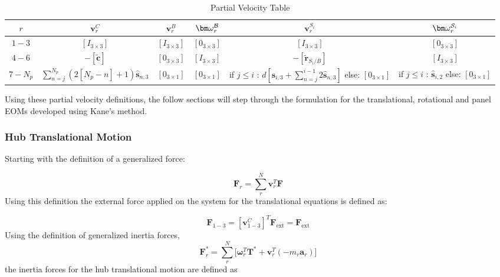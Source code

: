 \begin{table}[H]
	\caption{Partial Velocity Table}
	\label{tab:hub}
	\centering \fontsize{10}{10}\selectfont
	\begin{tabular}{ |c | c | c | c | c | c |} %
		\hline
		$r$ & $\bm v^{C}_{r}$ & $\bm v^{B}_{r}$  & $\bm \omega_{\textit{r}}^{\cal{B}}$ & $\bm v^{S_i}_{r}$ & $\bm \omega_{\textit{r}}^{\cal{S}_\textit{i}}$ \\
		\hline \hline
		$1-3$ & $[I_{3\times 3}]$ & $[I_{3\times 3}]$ & $[0_{3\times 3}]$ & $ [I_{3\times 3}]$ & $[0_{3\times 3}]$ \\ \hline
		$4-6$ & $-[\tilde{\bm c}]$ & $[0_{3\times 3}]$ & $[I_{3\times 3}]$ & $ - [\tilde{{\bm r}}_{S_{i}/B}]$ & $[I_{3\times 3}]$ \\ \hline
		$7-{N_p}$ & $\sum_{n=j}^{N_p} (2[N_p - n]+1 )\bm{\hat{s}}_{n,3} $ & $[0_{3\times 1}]$ & $[0_{3\times 1}]$ & \specialcell{if $j \leq i$ : \\ $d [\bm{\hat{s}}_{i,3} + \sum^{i-1}_{n=j} 2\bm{\hat{s}}_{n,3}] $ \\ else:\\ $[0_{3\times 1}]$\\  }& \specialcell{if $j \leq i$ : \\ $\bm{\hat{s}}_{i,2} $ \\ else:\\ $[0_{3\times 1}]$} \\
		\hline
	\end{tabular}
\end{table}
Using these partial velocity definitions, the follow sections will step through the formulation for the translational, rotational and panel EOMs developed using Kane's method.

\subsubsection{Hub Translational Motion}
Starting with the definition of a generalized force:

\begin{equation}
	\bm F_r = \sum\limits_{r}^{N} \bm v_r^T \bm F
	\label{eq:genActive}
\end{equation}
Using this definition the external force applied on the system for the translational equations is defined as:

\begin{equation}
	\bm F_{1-3} = [\bm v^C_{1-3}]^T \bm F_{\text{ext}} = \bm F_{\text{ext}}
\end{equation}
Using the definition of generalized inertia forces,
\begin{equation}
	\bm F^*_r = \sum\limits_{r}^{N}\Big[\bm \omega_r^T \bm T^* +  \bm v_r^T (- m_r \bm a_r)\Big]
	\label{eq:genInert}
\end{equation}
the inertia forces for the hub translational motion are defined as

